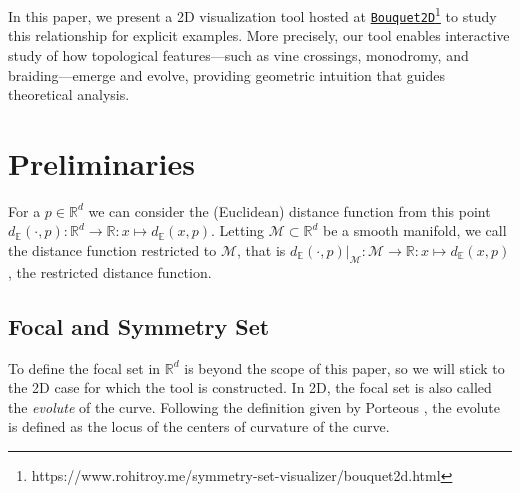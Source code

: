 \documentclass[a4paper,english,numberwithinsect]{eurocg26-submission}
\newcommand{\M}{\mathcal{M}}
\begin{document}


In this paper, we present a 2D visualization tool hosted at \href{https://www.rohitroy.me/symmetry-set-visualizer/bouquet2d.html}{\texttt{Bouquet2D}}\footnote{https://www.rohitroy.me/symmetry-set-visualizer/bouquet2d.html} to study this relationship for explicit examples. %
More precisely, our tool enables interactive study of how topological features—such as vine crossings, monodromy, and braiding—emerge and evolve, providing geometric intuition that guides theoretical analysis.

\section{Preliminaries}

\begin{definition}
For a $p \in \mathbb{R}^d$ we can consider the (Euclidean) distance function from this point $d_\mathbb{E} (\cdot,p): \mathbb{R}^d \to \mathbb{R}: x \mapsto d_\mathbb{E} (x, p)$. Letting $\M \subset \mathbb{R}^d$ be a smooth manifold, we call the distance function restricted to $\M$, that is $d_\mathbb{E}  (\cdot ,p) |_\M  : \M \to \mathbb{R}: x \mapsto d_\mathbb{E} (x, p)$, the restricted distance function.   
\end{definition} 

\subsection{Focal and Symmetry Set}

To define the focal set in $\mathbb{R}^d$ is beyond the scope of this paper, so we will stick to the 2D case for which the tool is constructed. In 2D, the focal set is also called the \textit{evolute} of the curve. Following the definition given by Porteous \cite{porteous2001geometric}, the evolute is defined as the locus of the centers of curvature of the curve.
\end{document}
